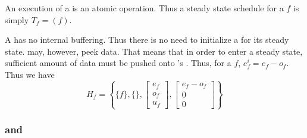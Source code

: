 \begin{comment}
This section will develop hierarchical scheduling techniques to
create initialization and steady state schedules. A simple
implementation of the hierarchical scheduling creates a
single-appearance schedule.  While single-appearance scheduling is
quite effective in scheduling {\StreamIt} programs, it is also easy
to construct programs that have {{\feedbackloops}} that are impossible
to schedule.  To alleviate the problem, the single-appearance
scheduling was slightly modified to allow {{\feedbackloops}} to
schedule programs using hierarchical push scheduling.  This does
not solve the problem altogether (some {{\feedbackloops}} are still
impossible to schedule using this technique), but this technique
is able to schedule many programs which cannot be scheduled with a
simple single-appearance scheduler.

Sample streams for techniques described here are taken from Figure
\ref{fig:hierarchical-schedule}.  The streams in Figure
\ref{fig:hierarchical-schedule} are identical to those in Figure
\ref{fig:steady-state} with exception of the {{\feedbackloop}}.
\end{comment}

\subsubsection{\filter}

An execution of a {\filter} is an atomic operation.  Thus a steady
state schedule for a {\filter} $f$ is simply $T_f = (f)$.

A {\filter} has no internal buffering.  Thus there is no need to
initialize a {\filter} for its steady state.  {\filters} may,
however, peek data.  That means that in order to enter a steady
state, sufficient amount of data must be pushed onto {\filter}'s
{\Input} {{\Channel}}.  Thus, for a {\filter} $f$, $e^i_f = e_f -
o_f$. Thus we have $$H_f = \left\{\{f\}, \{\}, \left[
\begin{array}{c}
e_f\\o_f\\u_f
\end{array}\right], \left[
\begin{array}{c}
e_f-o_f\\0\\0\end{array}\right] \right\}
$$

\subsubsection{{\pipelines} and {\splitjoins}}

